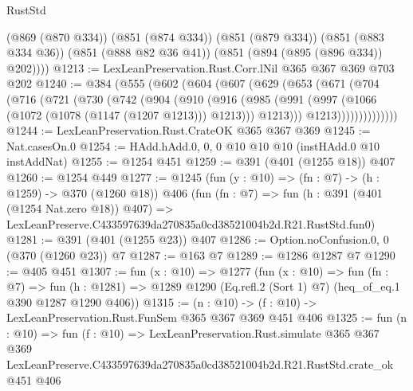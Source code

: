 \begin{lexlean}{RustStd}
\begin{coremodule}
        (@869 (@870 @334))
        (@851 (@874 @334))
        (@851 (@879 @334))
        (@851 (@883 @334 @36))
        (@851 (@888 @82 @36 @41))
        (@851 (@894 (@895 (@896 @334)) @202))))
@1213 := LexLeanPreservation.Rust.Corr.lNil @365 @367 @369 @703 @202
@1240 := @384
    (@555
      (@602
        (@604
          (@607
            (@629
              (@653
                (@671
                  (@704
                    (@716
                      (@721
                        (@730
                          (@742
                            (@904
                              (@910
                                (@916
                                  (@985
                                    (@991
                                      (@997 (@1066 (@1072 (@1078 (@1147 (@1207 @1213))) @1213)))
                                      @1213)))
                                @1213))))))))))))))
@1244 := LexLeanPreservation.Rust.CrateOK @365 @367 @369
@1245 := Nat.casesOn.{0}
@1254 := HAdd.hAdd.{0, 0, 0} @10 @10 @10 (instHAdd.{0} @10 instAddNat)
@1255 := @1254 @451
@1259 := @391 (@401 (@1255 @18)) @407
@1260 := @1254 @449
@1277 := @1245
    (fun (y : @10) => (fn : @7) -> (h : @1259) -> @370 (@1260 @18))
    @406
    (fun (fn : @7) =>
    fun (h : @391 (@401 (@1254 Nat.zero @18)) @407) =>
    LexLeanPreserve.C433597639da270835a0cd38521004b2d.R21.RustStd.fun0)
@1281 := @391 (@401 (@1255 @23)) @407
@1286 := Option.noConfusion.{0, 0} (@370 (@1260 @23)) @7
@1287 := @163 @7
@1289 := @1286 @1287 @7
@1290 := @405 @451
@1307 := fun (x : @10) =>
  @1277
    (fun (x : @10) =>
    fun (fn : @7) =>
    fun (h : @1281) => @1289 @1290 (Eq.refl.{2} (Sort 1) @7) (heq_of_eq.{1} @390 @1287 @1290 @406))
@1315 := (n : @10) -> (f : @10) -> LexLeanPreservation.Rust.FunSem @365 @367 @369 @451 @406
@1325 := fun (n : @10) =>
  fun (f : @10) =>
  LexLeanPreservation.Rust.simulate
    @365
    @367
    @369
    LexLeanPreserve.C433597639da270835a0cd38521004b2d.R21.RustStd.crate_ok
    @451
    @406
\end{coremodule}
\end{lexlean}
